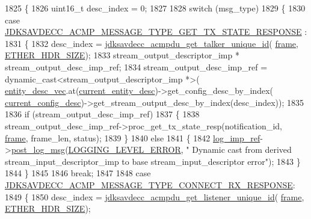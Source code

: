 \begin{DoxyCode}
1825 \{
1826     uint16\_t desc\_index = 0;
1827 
1828     \textcolor{keywordflow}{switch} (msg\_type)
1829     \{
1830     \textcolor{keywordflow}{case} \hyperlink{group__acmp__message__type_gaf9b24b0190d5bf9cae7e37c4a31cda12}{JDKSAVDECC\_ACMP\_MESSAGE\_TYPE\_GET\_TX\_STATE\_RESPONSE}
      :
1831     \{
1832         desc\_index = \hyperlink{group__acmpdu_ga1f24a73adfcd4cf526ad8c10a6f2e42f}{jdksavdecc\_acmpdu\_get\_talker\_unique\_id}(
      \hyperlink{gst__avb__playbin_8c_ac8e710e0b5e994c0545d75d69868c6f0}{frame}, \hyperlink{namespaceavdecc__lib_a6c827b1a0d973e18119c5e3da518e65ca9512ad9b34302ba7048d88197e0a2dc0}{ETHER\_HDR\_SIZE});
1833         stream\_output\_descriptor\_imp * stream\_output\_desc\_imp\_ref;
1834         stream\_output\_desc\_imp\_ref = \textcolor{keyword}{dynamic\_cast<}stream\_output\_descriptor\_imp *\textcolor{keyword}{>}(
      \hyperlink{classavdecc__lib_1_1end__station__imp_a72edab41bc56e3c1757944a7df188a3d}{entity\_desc\_vec}.at(\hyperlink{classavdecc__lib_1_1end__station__imp_afd78c89df26ba7641e1adb764c0e827d}{current\_entity\_desc})->get\_config\_desc\_by\_index(
      \hyperlink{classavdecc__lib_1_1end__station__imp_a60b1af40d35e8a86b0082c54ab6cb6a8}{current\_config\_desc})->get\_stream\_output\_desc\_by\_index(desc\_index));
1835 
1836         \textcolor{keywordflow}{if} (stream\_output\_desc\_imp\_ref)
1837         \{
1838             stream\_output\_desc\_imp\_ref->proc\_get\_tx\_state\_resp(notification\_id, 
      \hyperlink{gst__avb__playbin_8c_ac8e710e0b5e994c0545d75d69868c6f0}{frame}, frame\_len, status);
1839         \}
1840         \textcolor{keywordflow}{else}
1841         \{
1842             \hyperlink{namespaceavdecc__lib_acbe3e2a96ae6524943ca532c87a28529}{log\_imp\_ref}->\hyperlink{classavdecc__lib_1_1log_a68139a6297697e4ccebf36ccfd02e44a}{post\_log\_msg}(\hyperlink{namespaceavdecc__lib_a501055c431e6872ef46f252ad13f85cdaf2c4481208273451a6f5c7bb9770ec8a}{LOGGING\_LEVEL\_ERROR}, \textcolor{stringliteral}{"
      Dynamic cast from derived stream\_input\_descriptor\_imp to base stream\_input\_descriptor error"});
1843         \}
1844     \}
1845 
1846     \textcolor{keywordflow}{break};
1847 
1848     \textcolor{keywordflow}{case} \hyperlink{group__acmp__message__type_ga387118815f681eccff5e5b1a2025b1c4}{JDKSAVDECC\_ACMP\_MESSAGE\_TYPE\_CONNECT\_RX\_RESPONSE}:
1849     \{
1850         desc\_index = \hyperlink{group__acmpdu_ga36867bfc130619cbea38caa3ce54bc89}{jdksavdecc\_acmpdu\_get\_listener\_unique\_id}(
      \hyperlink{gst__avb__playbin_8c_ac8e710e0b5e994c0545d75d69868c6f0}{frame}, \hyperlink{namespaceavdecc__lib_a6c827b1a0d973e18119c5e3da518e65ca9512ad9b34302ba7048d88197e0a2dc0}{ETHER\_HDR\_SIZE});

\end{DoxyCode}
